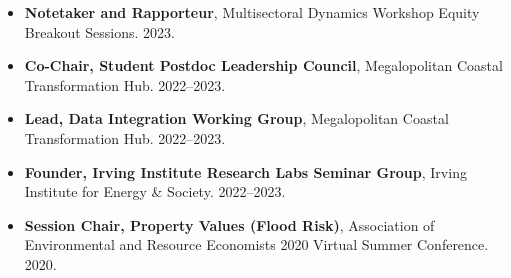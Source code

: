\documentclass[10pt,oneside]{article}
\begin{document}
\begin{itemize}[label={}]
  \item \textbf{Notetaker and Rapporteur}, Multisectoral Dynamics Workshop Equity Breakout Sessions. 2023.
  
  \item \textbf{Co-Chair, Student Postdoc Leadership Council}, Megalopolitan Coastal Transformation Hub. 2022--2023.
  
  \item \textbf{Lead, Data Integration Working Group}, Megalopolitan Coastal Transformation Hub. 2022--2023.
  
  \item \textbf{Founder, Irving Institute Research Labs Seminar Group}, Irving Institute for Energy \& Society. 2022--2023.
  
  \item \textbf{Session Chair, Property Values (Flood Risk)}, Association of Environmental and Resource Economists 2020 Virtual Summer Conference. 2020.
  
\end{itemize}
\end{document}
